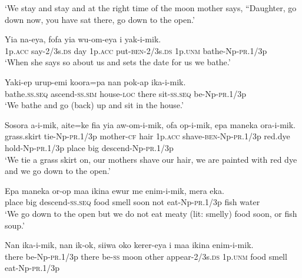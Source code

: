 \glt ‘We stay and stay and at the right time of the moon mother says, “Daughter, go down now, you have sat there, go down to the open.’ \\
\z


\ea
\gll  Yia  na-eya,  fofa  yia  wu-om-eya          i  yak-i-mik. \\
1p.\textsc{acc}  say-2/3s.\textsc{ds}  day  1p.\textsc{acc}  put-\textsc{ben}-2/3s.\textsc{ds} 1p.\textsc{unm}  bathe-Np-\textsc{pr}.1/3p \\


\glt ‘When she says so about us and sets the date for us we bathe.’ \\
\z


\ea
\gll  Yaki-ep  urup-emi  koora=pa  nan  pok-ap  ika-i-mik. \\
bathe.\textsc{ss.seq}  ascend-\textsc{ss}.\textsc{sim}  house-\textsc{loc}  there  sit-\textsc{ss.seq}  be-Np-\textsc{pr}.1/3p \\
\glt ‘We bathe and go (back) up and sit in the house.’ \\
\z


\ea
\gll  Sosora  a-i-mik,  aite=ke  fia  yia  aw-om-i-mik,                      ofa  op-i-mik,  epa  maneka  ora-i-mik. \\
grass.skirt  tie-Np-\textsc{pr}.1/3p  mother-\textsc{cf}  hair  1p.\textsc{acc}  shave-\textsc{ben}-Np-\textsc{pr}.1/3p   red.dye  hold-Np-\textsc{pr}.1/3p  place  big  descend-Np-\textsc{pr}.1/3p \\


\glt ‘We tie a grass skirt on, our mothers shave our hair, we are painted with red dye and we go down to the open.’ \\
\z


\ea
\gll  Epa  maneka  or-op  maa  ikina  ewur  me  enim-i-mik,         mera  eka. \\
place  big  descend-\textsc{ss.seq}  food  smell  soon  not  eat-Np-\textsc{pr}.1/3p  fish  water \\


\glt ‘We go down to the open but we do not eat meaty (lit: smelly) food soon, or fish soup.’ \\
\z


\ea
\gll  Nan  ika-i-mik,  nan  ik-ok,  siiwa  oko  kerer-eya  i             maa  ikina  enim-i-mik. \\
there  be-Np-\textsc{pr}.1/3p  there  be-\textsc{ss}  moon  other  appear-2/3s.\textsc{ds}  1p.\textsc{unm}  food  smell  eat-Np-\textsc{pr}.1/3p \\



